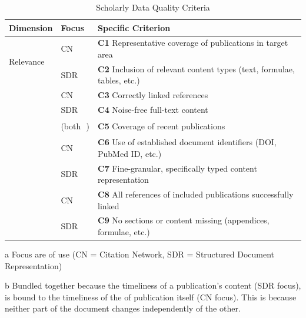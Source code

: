 \begin{table}[tb]
  \caption{Scholarly Data Quality Criteria}
  \label{tab:scholdataquali}
  \centering
  \begin{small}
    \begin{threeparttable}
      \begin{tabular}{lll}  %
        \toprule
        Dimension & Focus\tnote{a} & Specific Criterion\\
        \midrule
        \multirow{2}{*}{Relevance} & CN & \textbf{C1} Representative coverage of publications in target area \\
        \ & SDR & \textbf{C2} Inclusion of relevant content types (text, formulae, tables, etc.) \\
        \arrayrulecolor{lightgrey}\hline\arrayrulecolor{black}
        \multirow{2}{*}{Accuracy} & CN & \textbf{C3} Correctly linked references \\
        \ & SDR & \textbf{C4} Noise-free full-text content \\
        \arrayrulecolor{lightgrey}\hline\arrayrulecolor{black}
        \multirow{2}{*}{Timeliness} & \multirow{2}{*}{(both\tnote{b}~\,)} & \multirow{2}{*}{\textbf{C5} Coverage of recent publications} \\
        \ & \ & \ \\
        \arrayrulecolor{lightgrey}\hline\arrayrulecolor{black}
        \multirow{2}{*}{Comparability} & CN & \textbf{C6} Use of established document identifiers (DOI, PubMed ID, etc.) \\
        \ & SDR & \textbf{C7} Fine-granular, specifically typed content representation \\
        \arrayrulecolor{lightgrey}\hline\arrayrulecolor{black}
        \multirow{2}{*}{Completeness} & CN & \textbf{C8} All references of included publications successfully linked \\
        \ & SDR & \textbf{C9} No sections or content missing (appendices, formulae, etc.) \\
        \bottomrule
      \end{tabular}
      \begin{tablenotes}
        \item[a] Focus are of use (CN = Citation Network, SDR = Structured Document Representation)
        \item[b] Bundled together because the timeliness of a publication's content (SDR focus), is bound to the timeliness of the of publication itself (CN focus). This is because neither part of the document changes independently of the other.
      \end{tablenotes}
    \end{threeparttable}
  \end{small}
\end{table}

